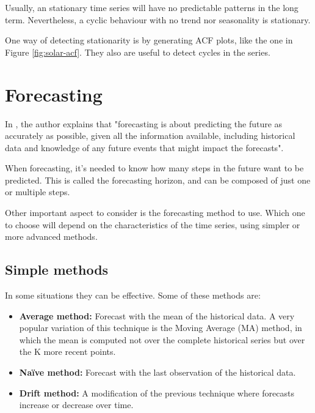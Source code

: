 Usually, an stationary time series will have no predictable patterns in the long term. Nevertheless, a cyclic behaviour with no trend nor seasonality is stationary.

One way of detecting stationarity is by generating ACF plots, like the one in Figure \ref{fig:solar-acf}. They also are useful to detect cycles in the series.


\section{Forecasting}
In \cite{hyndman2018forecasting}, the author explains that "forecasting is about predicting the future as accurately as possible, given all the information available, including historical data and knowledge of any future events that might impact the forecasts".

When forecasting, it's needed to know how many steps in the future want to be predicted. This is called the forecasting horizon, and can be composed of just one or multiple steps.

Other important aspect to consider is the forecasting method to use. Which one to choose will depend on the characteristics of the time series, using simpler or more advanced methods.


\subsection{Simple methods}
In some situations they can be effective. Some of these methods are: \cite{hyndman2018forecasting}
\begin{itemize}
    \item \textbf{Average method:} Forecast with the mean of the historical data. A very popular variation of this technique is the Moving Average (MA) method, in which the mean is computed not over the complete historical series but over the K more recent points.
    \item \textbf{Naïve method:} Forecast with the last observation of the historical data.
    \item \textbf{Drift method:} A modification of the previous technique where forecasts increase or decrease over time.
\end{itemize}

